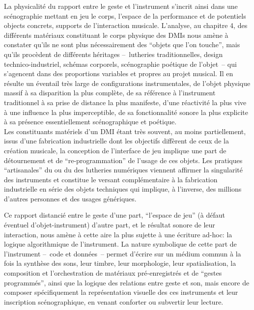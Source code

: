 
\noindent La physicalité du rapport entre le geste et l'instrument s'incrit ainsi dans une scénographie mettant en jeu le corps, l'espace de la performance et de potentiels objects concrets, supports de l'interaction musicale. L'analyse, au chapitre 4, des différents matériaux constituant le corps physique des \glspl{DMI} nous amène à constater qu'ils ne sont plus nécessairement des ``objets que l'on touche'', mais qu'ils procèdent de différents héritages --~lutheries traditionnelles, design technico-industriel, schémas corporels, scénographie poétique de l'objet~-- qui s'agencent dans des proportions variables et propres au projet musical. Il en résulte un éventail très large de configurations instrumentales, de l'objet physique massif à sa disparition la plus complète, de sa référence à l'instrument traditionnel à sa prise de distance la plus manifeste, d'une réactivité la plus vive à une influence la plus imperceptible, de sa fonctionnalité sonore la plus explicite à sa présence essentiellement scénographique et poétique.\\

\indent Les constituants matériels d'un \gls{DMI} étant très souvent, au moins partiellement, issus d'une fabrication industrielle dont les objectifs diffèrent de ceux de la création musicale, la conception de l'interface de jeu implique une part de détournement et de ``re-programmation'' de l'usage de ces objets. Les pratiques ``artisanales'' du  ou du  des lutheries numériques viennent affirmer la singularité des instruments et constitue le versant complémentaire à la fabrication industrielle en série des objets techniques qui implique, à l'inverse, des millions d'autres personnes et des usages génériques.





\indent Ce rapport distancié entre le geste d'une part, ``l'espace de jeu'' (à défaut éventuel d'objet-instrument) d'autre part, et le résultat sonore de leur interaction, nous amène à cette aire la plus sujette à une écriture ad-hoc: la logique algorithmique de l'instrument. La nature symbolique de cette part de l'instrument --~code et données~-- permet d'écrire sur un médium commun à la fois la synthèse des sons, leur timbre, leur morphologie, leur spatialisation, la composition et l'orchestration de matériaux pré-enregistrés et de ``gestes programmés'', ainsi que la logique des relations entre geste et son, mais encore de composer spécifiquement la représentation visuelle des ces instruments et leur inscription scénographique, en venant conforter ou subvertir leur lecture.

